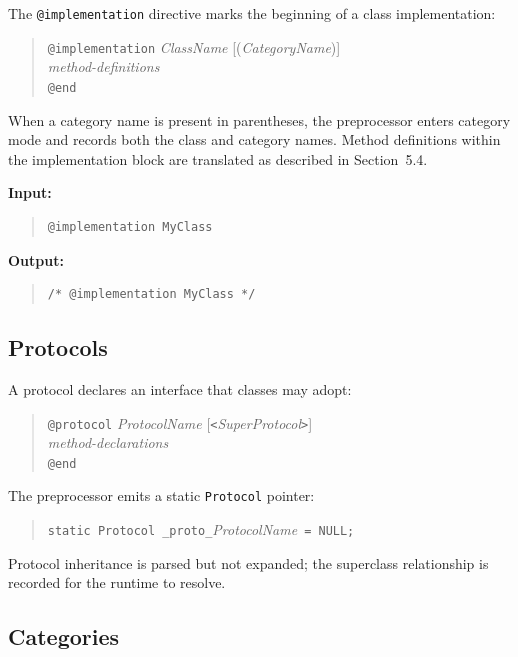 \documentclass[11pt,twoside]{article}
\newcommand{\meta}[1]{{\itshape #1}}
\begin{document}
The {\tt @implementation} directive marks the beginning of a class
implementation:
\begin{quote}
{\tt @implementation} {\meta{ClassName}} [({\meta{CategoryName}})]\\
{\meta{method-definitions}}\\
{\tt @end}
\end{quote}

When a category name is present in parentheses, the preprocessor enters
category mode and records both the class and category names.  Method
definitions within the implementation block are translated as described
in Section~5.4.

{\bf Input:}
\begin{quote}
\begin{verbatim}
@implementation MyClass
\end{verbatim}
\end{quote}

{\bf Output:}
\begin{quote}
\begin{verbatim}
/* @implementation MyClass */
\end{verbatim}
\end{quote}

\subsection{Protocols}

A protocol declares an interface that classes may adopt:
\begin{quote}
{\tt @protocol} {\meta{ProtocolName}} [{\tt <}{\meta{SuperProtocol}}{\tt >}]\\
{\meta{method-declarations}}\\
{\tt @end}
\end{quote}

The preprocessor emits a static {\tt Protocol} pointer:
\begin{quote}
{\tt static Protocol}~{\tt *}{\tt \_proto\_}{\meta{ProtocolName}}~{\tt = NULL;}
\end{quote}

Protocol inheritance is parsed but not expanded; the superclass
relationship is recorded for the runtime to resolve.

\subsection{Categories}
\end{document}

